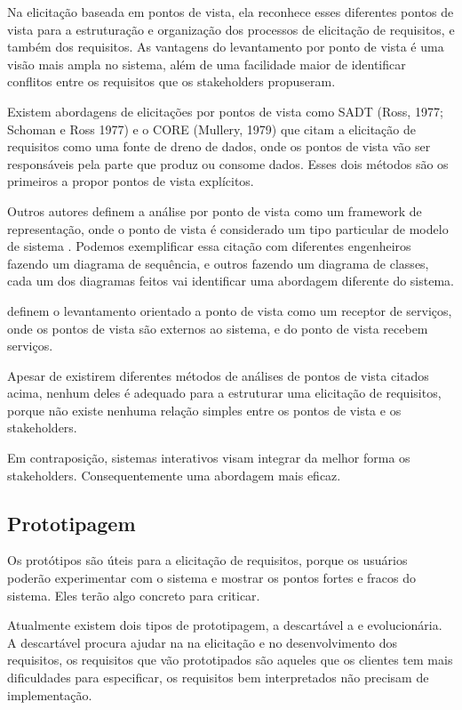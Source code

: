 Na elicitação baseada em pontos de vista, ela reconhece esses diferentes pontos de vista para a estruturação e organização dos processos de elicitação de requisitos, e também dos requisitos. As vantagens do levantamento por ponto de vista é uma visão mais ampla no sistema, além de uma facilidade maior de identificar conflitos entre os requisitos que os stakeholders propuseram.

Existem abordagens de elicitações por pontos de vista como SADT (Ross, 1977; Schoman e Ross 1977) e o CORE (Mullery, 1979) que citam a elicitação de requisitos como uma fonte de dreno de dados, onde os pontos de vista vão ser responsáveis pela parte que produz ou consome dados. Esses dois métodos são os primeiros a propor pontos de vista explícitos.

Outros autores definem a análise por ponto de vista como um framework de representação, onde o ponto de vista é considerado um tipo particular de modelo de sistema \cite {gotel}. Podemos exemplificar essa citação com diferentes engenheiros fazendo um diagrama de sequência, e outros fazendo um diagrama de classes, cada um dos diagramas feitos vai identificar uma abordagem diferente do sistema.

\cite {kotonya} definem o levantamento orientado a ponto de vista como um receptor de serviços, onde os pontos de vista são externos ao sistema, e do ponto de vista recebem serviços.

Apesar de existirem diferentes métodos de análises de pontos de vista citados acima, nenhum deles é adequado para a estruturar uma elicitação de requisitos, porque não existe nenhuma relação simples entre os pontos de vista e os stakeholders.

Em contraposição, sistemas interativos visam integrar da melhor forma os stakeholders. Consequentemente uma abordagem mais eficaz.

\subsection {Prototipagem}

Os protótipos são úteis para a elicitação de requisitos, porque os usuários poderão experimentar com o sistema e mostrar os pontos fortes e fracos do sistema. Eles terão algo concreto para criticar. \cite{castro}

Atualmente existem dois tipos de prototipagem, a descartável a e evolucionária. A descartável procura ajudar na na elicitação e no desenvolvimento dos requisitos, os requisitos que vão prototipados são aqueles que os clientes tem
mais dificuldades para especificar, os requisitos bem interpretados não precisam de implementação.

